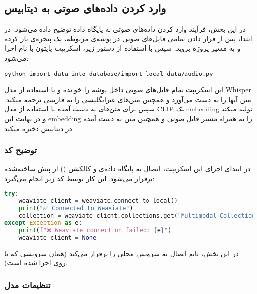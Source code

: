 \documentclass{article}
\begin{document}


\subsection{وارد کردن داده‌های صوتی به دیتابیس}

در این بخش، فرآیند وارد کردن داده‌های صوتی به پایگاه داده توضیح داده می‌شود.  
در ابتدا، پس از قرار دادن تمامی فایل‌های صوتی در پوشه‌ی مربوطه، یک پنجره‌ی  باز کرده و به مسیر پروژه بروید. سپس با استفاده از دستور زیر، اسکریپت پایتون با نام  اجرا می‌شود:

\begin{latin}
\begin{lstlisting}
python import_data_into_database/import_local_data/audio.py
\end{lstlisting}
\end{latin}

این اسکریپت تمام فایل‌های صوتی داخل پوشه  را خوانده و با استفاده از مدل Whisper متن آنها را به دست می‌آورد و همچنین متن‌های غیرانگلیسی را به فارسی ترجمه میکند. سپس برای متن‌های به دست آمده با استفاده از مدل CLIP یک embedding تولید میکند و در نهایت این embedding را به همراه مسیر فایل صوتی و همچنین متن به دست آمده در دیتابیس ذخیره میکند.

\subsubsection{توضیح کد}

در ابتدای اجرای این اسکریپت، اتصال به پایگاه داده‌ی  و کالکشن () از پیش ساخته‌شده برقرار می‌شود. این کار توسط کد زیر انجام می‌گیرد:

\begin{latin}
\begin{lstlisting}[language=Python]
try:
    weaviate_client = weaviate.connect_to_local()
    print("✅ Connected to Weaviate")
    collection = weaviate_client.collections.get("Multimodal_Collection")
except Exception as e:
    print(f"❌ Weaviate connection failed: {e}")
    weaviate_client = None
\end{lstlisting}
\end{latin}

در این بخش، تابع  اتصال به سرویس محلی  را برقرار می‌کند (همان سرویسی که با  روی  اجرا شده است).

\subsubsection{تنظیمات مدل }
\end{document}
